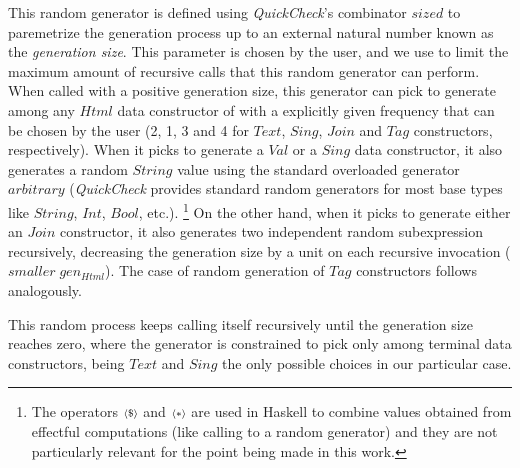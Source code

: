 \documentclass[conference, fleqn]{IEEEtran}
\newcommand{\Conid}[1]{\mathit{#1}}
\newcommand{\Varid}[1]{\mathit{#1}}
\newcommand{\tocite}{\textbf{CITE}}
\newcommand{\quickcheck}{\emph{QuickCheck}\xspace}
\begin{document}
%
This random generator is defined using \quickcheck's combinator \ensuremath{\Varid{sized}} to
paremetrize the generation process up to an external natural number known as the
\emph{generation size}.
%
This parameter is chosen by the user, and we use to limit the maximum amount of
recursive calls that this random generator can perform.
%
When called with a positive generation size, this generator can pick to generate
among any \ensuremath{\Conid{Html}} data constructor of with a explicitly given frequency that can
be chosen by the user (2, 1, 3 and 4 for \ensuremath{\Conid{Text}}, \ensuremath{\Conid{Sing}}, \ensuremath{\Conid{Join}} and \ensuremath{\Conid{Tag}}
constructors, respectively).
%
When it picks to generate a \ensuremath{\Conid{Val}} or a \ensuremath{\Conid{Sing}} data constructor, it also
generates a random \ensuremath{\Conid{String}} value using the standard overloaded generator
\ensuremath{\Varid{arbitrary}} (\quickcheck provides standard random generators for most base types
like \ensuremath{\Conid{String}}, \ensuremath{\Conid{Int}}, \ensuremath{\Conid{Bool}}, etc.). \footnote{%
  The operators \ensuremath{\mathop{\mathsmaller{\langle \$ \rangle}}} and \ensuremath{\mathop{\mathsmaller{\langle \ast \rangle}}} are used in Haskell to combine values obtained
  from effectful computations (like calling to a random generator) and they are
  not particularly relevant for the point being made in this work.}
On the other hand, when it picks to generate either an \ensuremath{\Conid{Join}} constructor, it
also generates two independent random subexpression recursively, decreasing the
generation size by a unit on each recursive invocation (\ensuremath{\Varid{smaller}\;gen_{Html}}).
%
The case of random generation of \ensuremath{\Conid{Tag}} constructors follows analogously.


This random process keeps calling itself recursively until the generation size
reaches zero, where the generator is constrained to pick only among terminal
data constructors, being \ensuremath{\Conid{Text}} and \ensuremath{\Conid{Sing}} the only possible choices in our
particular case.

%
\end{document}
